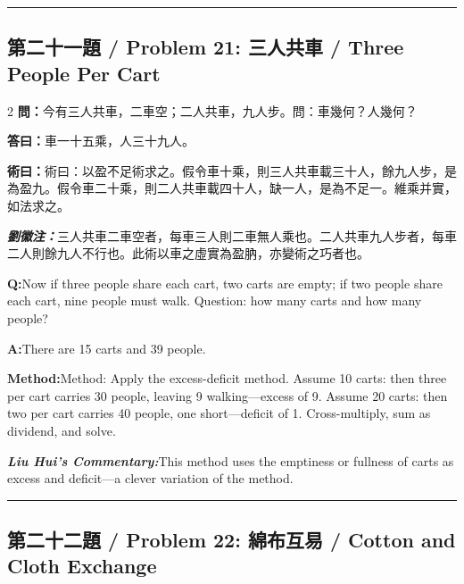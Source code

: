 \documentclass[11pt,a4paper]{article}
\newcommand{\cnwen}{\textcolor{cnlabelfg}{\textbf{問：}}}
\newcommand{\cnda}{\textbf{答曰：}}
\newcommand{\cnshu}{\textcolor{cnlabelfg}{\textbf{術曰：}}}
\newcommand{\cnzhu}{\textcolor{commentarycolor}{\textit{\textbf{劉徽注：}}}}
\newcommand{\enwen}{\textcolor{enlabelfg}{\textbf{Q:}}}
\newcommand{\enda}{\textcolor{enlabelfg}{\textbf{A:}}}
\newcommand{\enshu}{\textcolor{enlabelfg}{\textbf{Method:}}}
\newcommand{\enzhu}{\textcolor{enlabelfg}{\textit{\textbf{Liu Hui's Commentary:}}}}
\begin{document}
\bigskip\hrule\bigskip

\subsection{第二十一題 / Problem 21: 三人共車 / Three People Per Cart}

\begin{paracol}{2}
\switchcolumn[0]
\cnwen 今有三人共車，二車空；二人共車，九人步。問：車幾何？人幾何？

\cnda 車一十五乘，人三十九人。

\cnshu 術曰：以盈不足術求之。假令車十乘，則三人共車載三十人，餘九人步，是為盈九。假令車二十乘，則二人共車載四十人，缺一人，是為不足一。維乘并實，如法求之。

\cnzhu 三人共車二車空者，每車三人則二車無人乘也。二人共車九人步者，每車二人則餘九人不行也。此術以車之虛實為盈肭，亦變術之巧者也。

\switchcolumn[1]
\enwen Now if three people share each cart, two carts are empty; if two people share each cart, nine people must walk. Question: how many carts and how many people?

\enda There are 15 carts and 39 people.

\enshu Method: Apply the excess-deficit method. Assume 10 carts: then three per cart carries 30 people, leaving 9 walking---excess of 9. Assume 20 carts: then two per cart carries 40 people, one short---deficit of 1. Cross-multiply, sum as dividend, and solve.

\enzhu This method uses the emptiness or fullness of carts as excess and deficit---a clever variation of the method.
\end{paracol}

\bigskip\hrule\bigskip

\subsection{第二十二題 / Problem 22: 綿布互易 / Cotton and Cloth Exchange}
\end{document}
